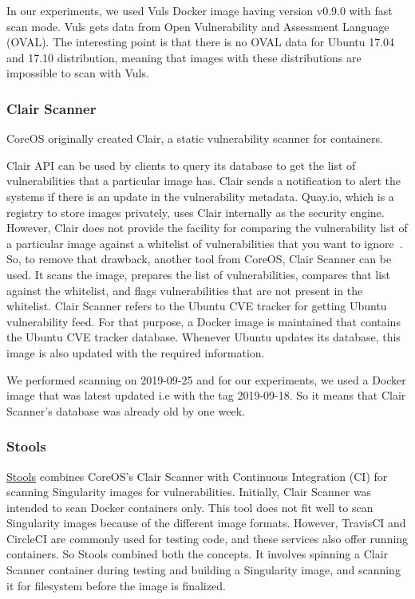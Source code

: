 \documentclass[a4paper,num-refs]{oup-contemporary}
\begin{document}
In our experiments, we used Vuls Docker image having version v0.9.0 with fast scan mode.
Vuls gets data from Open Vulnerability and Assessment Language (OVAL).
The interesting point is that there is no OVAL data for Ubuntu 17.04 and 17.10 distribution,
meaning that images with these distributions are impossible to scan with Vuls.

\subsubsection{Clair Scanner}

CoreOS originally created Clair, a static vulnerability scanner for containers. 

Clair API can be used by clients to query its database to get
the list of vulnerabilities that a particular image has. Clair sends a notification
to alert the systems if there is an update in the vulnerability metadata. Quay.io, which
is a registry to store images privately, uses Clair internally as the security engine. However, Clair does not 
provide the facility for comparing
the vulnerability list of a particular image against a whitelist of vulnerabilities that you
want to ignore~\cite{arminc_2019}. 
So, to remove
that drawback, another tool from CoreOS, Clair Scanner can be used. It scans the image, prepares the list of
vulnerabilities, compares that list against the whitelist, and flags vulnerabilities
that are not present in the whitelist.
Clair Scanner refers to the Ubuntu CVE tracker for getting Ubuntu vulnerability feed.
For that purpose, a Docker image is maintained that contains the Ubuntu CVE tracker database.
Whenever Ubuntu updates its database, this image is also updated with the required information.

We performed scanning on 2019-09-25 and for our experiments, we used a Docker image that was 
latest updated i.e with the tag 2019-09-18. So it means that Clair Scanner's database was already
old by one week.

\subsubsection{Stools}

\href{https://github.com/singularityhub/stools}{Stools} combines CoreOS's Clair Scanner with Continuous Integration (CI)
for scanning Singularity images for vulnerabilities.
Initially, Clair Scanner was intended to scan Docker containers only. This tool does not fit well
to scan Singularity images because of the different image formats.
However, TravisCI and CircleCI are commonly used for testing code, and these
services also offer running containers. So Stools combined both the concepts.
It involves spinning a Clair Scanner container during testing and building a
Singularity image, and scanning it for filesystem before the image is finalized.
\end{document}
